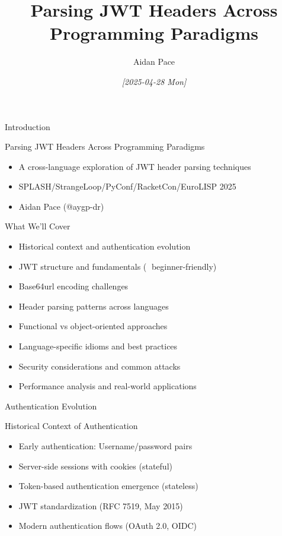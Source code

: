 \documentclass[presentation,aspectratio=169]{beamer}
\author{Aidan Pace}
\date{\textit{{[}2025-04-28 Mon]}}
\title{Parsing JWT Headers Across Programming Paradigms}
\begin{document}
\maketitle
\begin{frame}[label={sec:org7307491}]{Introduction}
\begin{block}{Parsing JWT Headers Across Programming Paradigms}
\begin{itemize}[<+->]
\item A cross-language exploration of JWT header parsing techniques
\item SPLASH/StrangeLoop/PyConf/RacketCon/EuroLISP 2025
\item Aidan Pace (@aygp-dr)
\end{itemize}
\end{block}
\begin{block}{What We'll Cover}
\begin{itemize}[<+->]
\item Historical context and authentication evolution
\item JWT structure and fundamentals (🔰 beginner-friendly)
\item Base64url encoding challenges
\item Header parsing patterns across languages
\item Functional vs object-oriented approaches
\item Language-specific idioms and best practices
\item Security considerations and common attacks
\item Performance analysis and real-world applications
\end{itemize}
\end{block}
\end{frame}
\begin{frame}[label={sec:orga89144f}]{Authentication Evolution}
\begin{block}{Historical Context of Authentication}
\begin{itemize}[<+->]
\item Early authentication: Username/password pairs
\item Server-side sessions with cookies (stateful)
\item Token-based authentication emergence (stateless)
\item JWT standardization (RFC 7519, May 2015)
\item Modern authentication flows (OAuth 2.0, OIDC)
\end{itemize}
\end{block}
\end{frame}
\end{document}
